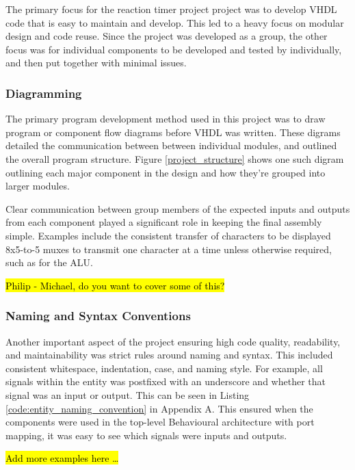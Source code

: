 \documentclass[11pt]{article}
\begin{document}
The primary focus for the reaction timer project project was to develop VHDL code that is easy to maintain and develop. This led to a heavy focus on modular design and code reuse. Since the project was developed as a group, the other focus was for individual components to be developed and tested by individually, and then put together with minimal issues. 

\subsubsection{Diagramming}

The primary program development method used in this project was to draw program or component flow diagrams before VHDL was written. These digrams detailed the communication between between individual modules, and outlined the overall program structure. Figure \ref{project_structure} shows one such digram outlining each major component in the design and how they're grouped into larger modules. 

Clear communication between group members of the expected inputs and outputs from each component played a significant role in keeping the final assembly simple. Examples include the consistent transfer of characters to be displayed 8x5-to-5 muxes to transmit one character at a time unless otherwise required, such as for the ALU.

\hl{Philip - Michael, do you want to cover some of this?}

\subsubsection{Naming and Syntax Conventions}

Another important aspect of the project ensuring high code quality, readability, and maintainability was strict rules around naming and syntax. This included consistent whitespace, indentation, case, and naming style. For example, all signals within the entity was postfixed with an underscore and whether that signal was an input or output. This can be seen in Listing \ref{code:entity_naming_convention} in Appendix A. This ensured when the components were used in the top-level Behavioural architecture with port mapping, it was easy to see which signals were inputs and outputs.


\hl{Add more examples here \dots}
\end{document}
